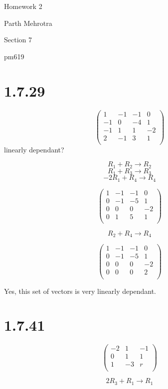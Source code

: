 \documentclass{article}
\begin{document}
\centerline{\sc \large Homework 2}
\vspace{0.5pc}
\centerline{Parth Mehrotra}
\centerline{Section 7}
\centerline{pm619}

\section*{1.7.29} 

\[ 
	\left( 
		\begin{array}{cccc}
			1&	-1&	-1&	0\\
			-1&	0&	-4&	1\\
			-1&	1&	1&	-2\\
			2&	-1&	3&	1\\
		\end{array} 
	\right)
\] 
linearly dependant?

\[	R_{1} + R_{2} \rightarrow R_{2}		\]
\[	R_{1} + R_{3} \rightarrow R_{3} 	\]
\[	-2R_{1} + R_{4} \rightarrow R_{4}	\]

\[
	\left(
		\begin{array}{cccc}
			1& -1&	-1& 0\\
			0&	-1&	-5&	1\\
			0&	0&	0&	-2\\
			0&	1&	5&	1\\
		\end{array}
	\right)
\]

\[	R_{2}+R_{4} \rightarrow R_{4}	\]

\[
	\left(
		\begin{array}{cccc}
			1& -1&	-1& 0\\
			0&	-1&	-5&	1\\
			0&	0&	0&	-2\\
			0&	0&	0&	2\\
		\end{array}
	\right)
\]

Yes, this set of vectors is very linearly dependant.
\newpage

\section*{1.7.41}

\[
	\left(
		\begin{array}{ccc}
			-2&	1&	-1\\
			0&	1&	1\\
			1&	-3&	r\\
		\end{array}
	\right)
\]

\[ 2R_{3} + R_{1} \rightarrow R_{1}	\]
\end{document}
